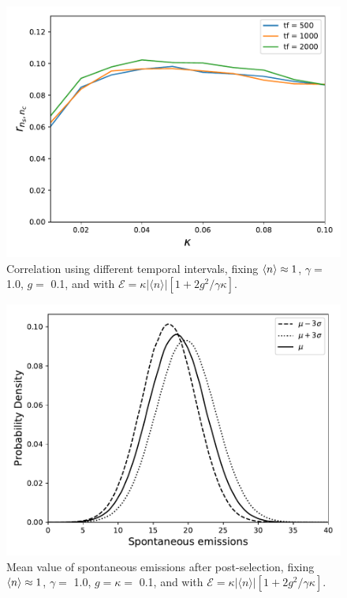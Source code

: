 \documentclass[%
 reprint,
 amsmath,amssymb,
 aps, 
]{revtex4-2}
\begin{document}
\begin{center}
\begin{figure}[h!]
\begin{center}
\includegraphics[scale = 0.5]{million2.pdf}
\caption{\small{Correlation using different temporal intervals, fixing $\expval{n} \approx 1$, $\gamma =$ 1.0, $g =$ 0.1, and with  $\mathcal{E} =  \kappa |\langle n \rangle|[1 + 2g^2/\gamma \kappa]$.}}  \label{errorzz}
\end{center}
\end{figure}
\end{center}

\begin{center}
\begin{figure}[h!]
\begin{center}
\includegraphics[scale = 0.5]{ccorr1.pdf}
\caption{\small{Mean value of spontaneous emissions after post-selection, fixing $\expval{n} \approx 1$, $\gamma =$ 1.0, $g = \kappa =$ 0.1, and with  $\mathcal{E} =  \kappa |\langle n \rangle|[1 + 2g^2/\gamma \kappa]$.}}  \label{errorzz}
\end{center}
\end{figure}
\end{center}
\end{document}
